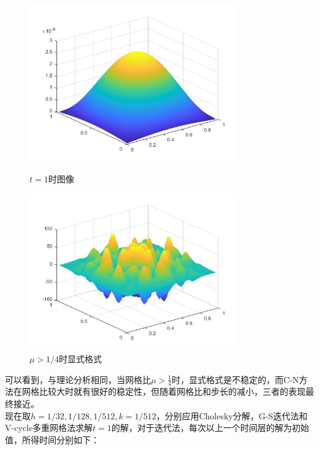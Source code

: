 \documentclass[12pt,fontset=mac]{ctexart}
\begin{document}
\begin{figure}[H]
	\centering
	\begin{minipage}[t]{0.48\textwidth}
		\centering
		\includegraphics[width=9cm]{热扩散.jpg}
		\caption{$t=1$时图像}
	\end{minipage}
	\begin{minipage}[t]{0.48\textwidth}
		\centering
		\includegraphics[width=9cm]{显式不稳定.jpg}
		\caption{$\mu>1/4$时显式格式}
	\end{minipage}
\end{figure}

\noindent 可以看到，与理论分析相同，当网格比$\mu > \frac{1}{4}$时，显式格式是不稳定的，而C-N方法在网格比较大时就有很好的稳定性，但随着网格比和步长的减小，三者的表现最终接近。\\
\indent 现在取$h = 1/32,1/128,1/512,k = 1/512$，分别应用Cholesky分解，G-S迭代法和V-cycle多重网格法求解$t=1$的解，对于迭代法，每次以上一个时间层的解为初始值，所得时间分别如下：\\
\end{document}
